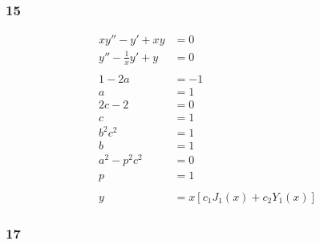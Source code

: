 \documentclass{article}
\begin{document}
\subsubsection{15}

\begin{align*}
  x y'' - y' + x y         & = 0                           \\
  y'' - \frac{1}{x} y' + y & = 0                           \\ \\
  1 - 2 a                  & = -1                          \\
  a                        & = 1                           \\
  2 c - 2                  & = 0                           \\
  c                        & = 1                           \\
  b^2 c^2                  & = 1                           \\
  b                        & = 1                           \\
  a^2 - p^2 c^2            & = 0                           \\
  p                        & = 1                           \\ \\
  y                        & = x [c_1 J_1(x) + c_2 Y_1(x)]
\end{align*}

\subsubsection{17}
\end{document}
